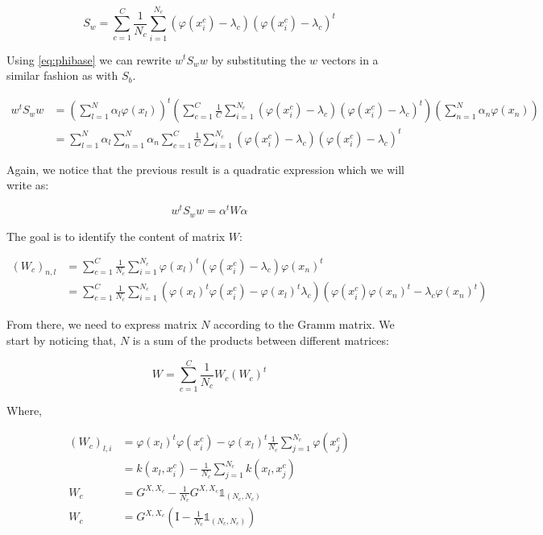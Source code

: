 \begin{equation*}
S_w = \sum_{c = 1}^C \frac{1}{N_c} \sum_{i = 1}^{N_c} (\varphi(x_i^c) - \lambda_c)(\varphi(x_i^c) -
\lambda_c)^t
\end{equation*}

Using \ref{eq:phibase} we can rewrite $w^tS_ww$ by substituting the $w$ vectors in a similar fashion as
with $S_b$.

\begin{align*}
  w^tS_ww &= \left( \sum_{l=1}^N \alpha_l \varphi(x_l)\right)^t
             \left( \sum_{c=1}^C \frac{1}{C}
                       \sum_{i=1}^{N_c} (\varphi(x_i^c) - \lambda_c)
                                        (\varphi(x_i^c) - \lambda_c)^t\right)
             \left( \sum_{n=1}^N \alpha_n \varphi(x_n)\right)\\
          &= \sum_{l=1}^N \alpha_l \sum_{n=1}^N \alpha_n \sum_{c=1}^C \frac{1}{C}
                \sum_{i=1}^{N_c} (\varphi(x_i^c) - \lambda_c)
                                 (\varphi(x_i^c) - \lambda_c)^t
\end{align*}

Again, we notice that the previous result is a quadratic expression which we will write as:

\begin{equation*}
w^tS_ww = \alpha^tW\alpha
\end{equation*}

The goal is to identify the content of matrix $W$:

\begin{align*}
  (W_c)_{n,l} &= \sum_{c=1}^C \frac{1}{N_c} \sum_{i=1}^{N_c}
                  \varphi(x_l)^t(\varphi(x_i^c) - \lambda_c)\varphi(x_n)^t \\
            &= \sum_{c=1}^C \frac{1}{N_c} \sum_{i=1}^{N_c} (\varphi(x_l)^t\varphi(x_i^c) -
            \varphi(x_l)^t\lambda_c) (\varphi(x_i^c)\varphi(x_n)^t -
            \lambda_c \varphi(x_n)^t)
\end{align*}

From there, we need to express matrix $N$ according to the Gramm matrix. We start by noticing that,
$N$ is a sum of the products between different matrices:

\begin{equation*}
W = \sum_{c=1}^C \frac{1}{N_c} W_c (W_c)^t
\end{equation*}

Where,

\begin{align*}
  (W_c)_{l, i} &= \varphi(x_l)^t\varphi(x_i^c) - \varphi(x_l)^t \frac{1}{N_c}\sum_{j=1}^{N_c}\varphi(x_j^c) \\
             &= k(x_l, x_i^c) - \frac{1}{N_c}\sum_{j=1}^{N_c}k(x_l, x_j^c) \\
   W_c       &= G^{X, X_c} - \frac{1}{N_c} G^{X, X_c} \mathds{1}_{(N_c, N_c)} \\
   W_c       &= G^{X, X_c} \left(\textrm{I} - \frac{1}{N_c}\mathds{1}_{(N_c, N_c)}\right)
\end{align*}

